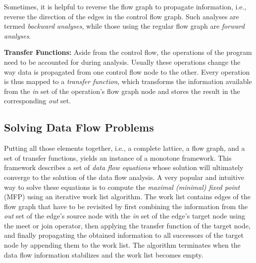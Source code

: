 Sometimes, it is helpful to reverse the flow graph to propagate information,
i.e., reverse the direction of the edges in the control flow graph. Such
analyses are termed \emph{backward analyses}, while those using the
regular flow graph are \emph{forward analyses}.

\textbf{Transfer Functions:}
Aside from the control flow, the operations of the program
need to be accounted for during analysis.
Usually these operations change the way data is propagated from one control
flow node to the other. Every operation is thus mapped
to a \emph{transfer function}, which transforms the information available from
the \emph{in} set of the operation's flow graph node and stores the result in
the corresponding \emph{out} set.

\subsection{Solving Data Flow Problems}

Putting all those elements together, i.e., a complete lattice, a flow graph, and
a set of transfer functions, yields an instance of a monotone framework.
This framework describes a set of \emph{data flow equations} whose solution will
ultimately converge to the solution of the data flow analysis. A very popular and
intuitive way to solve these equations is to compute the \emph{maximal (minimal) fixed point}
(MFP) using
an iterative work list algorithm. The work list contains edges of the flow graph
that have to be revisited by first combining the information from the \emph{out}
set of the edge's source node with the \emph{in} set of the edge's target node
using the meet or join operator, then applying the transfer function of the
target node, and finally propagating the obtained information to all successors
of the target node by appending them to the work list. The algorithm terminates
when the data flow information stabilizes and the work list becomes empty.

